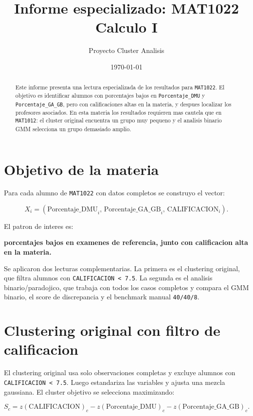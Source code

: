 \documentclass[11pt,letterpaper]{article}
\title{\textbf{Informe especializado: MAT1022}\\
\large Calculo I}
\author{Proyecto Cluster Analisis}
\date{\today}
\newcommand{\code}[1]{\texttt{#1}}
\begin{document}
\maketitle

\begin{abstract}
Este informe presenta una lectura especializada de los resultados para \code{MAT1022}. El objetivo es identificar alumnos con porcentajes bajos en \code{Porcentaje\_DMU} y \code{Porcentaje\_GA\_GB}, pero con calificaciones altas en la materia, y despues localizar los profesores asociados. En esta materia los resultados requieren mas cautela que en \code{MAT1012}: el cluster original encuentra un grupo muy pequeno y el analisis binario GMM selecciona un grupo demasiado amplio.
\end{abstract}

\section{Objetivo de la materia}

Para cada alumno de \code{MAT1022} con datos completos se construyo el vector:

\[
X_i =
\left(
\text{Porcentaje\_DMU}_i,\,
\text{Porcentaje\_GA\_GB}_i,\,
\text{CALIFICACION}_i
\right).
\]

El patron de interes es:

\begin{center}
\textbf{porcentajes bajos en examenes de referencia, junto con calificacion alta en la materia.}
\end{center}

Se aplicaron dos lecturas complementarias. La primera es el clustering original, que filtra alumnos con \code{CALIFICACION < 7.5}. La segunda es el analisis binario/paradojico, que trabaja con todos los casos completos y compara el GMM binario, el score de discrepancia y el benchmark manual \code{40/40/8}.

\section{Clustering original con filtro de calificacion}

El clustering original usa solo observaciones completas y excluye alumnos con \code{CALIFICACION < 7.5}. Luego estandariza las variables y ajusta una mezcla gaussiana. El cluster objetivo se selecciona maximizando:

\[
S_c =
z(\text{CALIFICACION})_c
- z(\text{Porcentaje\_DMU})_c
- z(\text{Porcentaje\_GA\_GB})_c.
\]
\end{document}
